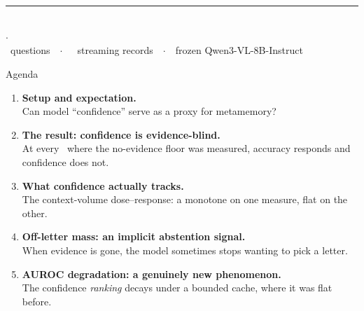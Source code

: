 \begin{frame}
  \vfill
  \begin{center}
    {\Large\bfseries\color{inkdark}\inserttitle}\\[0.7em]
    {\footnotesize\color{inkmid}\insertsubtitle}\\[1.4em]
    {\color{accblue}\rule{4cm}{1.2pt}}\\[1.2em]
    {\small\color{inkmid}\insertauthor \quad$\cdot$\quad \insertdate}\\[0.4em]
    {\scriptsize\color{inklight}\Nquestions\ questions\ \ $\cdot$\ \ \NrecEtwo\ streaming records\ \ $\cdot$\ \ frozen Qwen3-VL-8B-Instruct}
  \end{center}
  \vfill
\end{frame}

\begin{frame}[t]{Agenda}
  \begin{enumerate}\setlength\itemsep{0.6em}
    \item \textbf{Setup and expectation.}\\
      {\footnotesize\color{inkmid} Can model ``confidence'' serve as a proxy for metamemory?}
    \item \textbf{The result: confidence is evidence-blind.}\\
      {\footnotesize\color{inkmid} At every \dt\ where the no-evidence floor was measured, accuracy responds and confidence does not.}
    \item \textbf{What confidence actually tracks.}\\
      {\footnotesize\color{inkmid} The context-volume dose--response: a monotone on one measure, flat on the other.}
    \item \textbf{Off-letter mass: an implicit abstention signal.}\\
      {\footnotesize\color{inkmid} When evidence is gone, the model sometimes stops wanting to pick a letter.}
    \item \textbf{AUROC degradation: a genuinely new phenomenon.}\\
      {\footnotesize\color{inkmid} The confidence \emph{ranking} decays under a bounded cache, where it was flat before.}
  \end{enumerate}
\end{frame}

